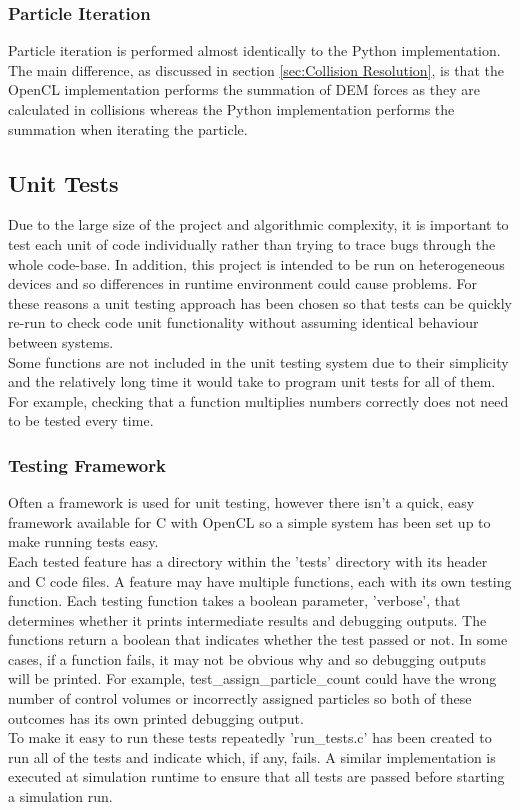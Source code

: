 \documentclass[10pt,a4paper,titlepage]{report}
\begin{document}
\subsubsection{Particle Iteration}
Particle iteration is performed almost identically to the Python implementation. The main difference, as discussed in section \ref{sec:Collision Resolution}, is that the OpenCL implementation performs the summation of DEM forces as they are calculated in collisions whereas the Python implementation performs the summation when iterating the particle.
\subsection{Unit Tests}
Due to the large size of the project and algorithmic complexity, it is important to test each unit of code individually rather than trying to trace bugs through the whole code-base. In addition, this project is intended to be run on heterogeneous devices and so differences in runtime environment could cause problems. For these reasons a unit testing approach has been chosen so that tests can be quickly re-run to check code unit functionality without assuming identical behaviour between systems.
\\Some functions are not included in the unit testing system due to their simplicity and the relatively long time it would take to program unit tests for all of them. For example, checking that a function multiplies numbers correctly does not need to be tested every time.
\subsubsection{Testing Framework}
Often a framework is used for unit testing, however there isn't a quick, easy framework available for C with OpenCL so a simple system has been set up to make running tests easy.
\\Each tested feature has a directory within the 'tests' directory with its header and C code files. A feature may have multiple functions, each with its own testing function. Each testing function takes a boolean parameter, 'verbose', that determines whether it prints intermediate results and debugging outputs. The functions return a boolean that indicates whether the test passed or not. In some cases, if a function fails, it may not be obvious why and so debugging outputs will be printed. For example, test\_assign\_particle\_count could have the wrong number of control volumes or incorrectly assigned particles so both of these outcomes has its own printed debugging output. %
\\To make it easy to run these tests repeatedly 'run\_tests.c' has been created to run all of the tests and indicate which, if any, fails. A similar implementation is executed at simulation runtime to ensure that all tests are passed before starting a simulation run.
\end{document}
